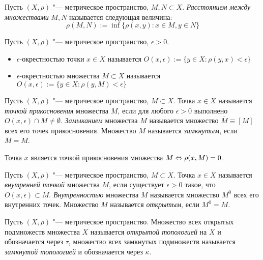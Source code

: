 \begin{definition}
	Пусть $(X, \rho)$ "--- метрическое пространство, $M, N \subset X$. \textit{Расстоянием между множествами} $M, N$ называется следующая величина:
	\[\rho(M, N) := \inf\{\rho(x, y): x \in M, y \in N\}\]
\end{definition}

\begin{definition}
	Пусть $(X, \rho)$ "--- метрическое пространство, $\epsilon > 0$.
	\begin{itemize}
		\item $\epsilon$-окрестностью точки $x \in X$ называется $O(x, \epsilon) := \{y \in X: \rho(y, x) < \epsilon\}$
		
		\item $\epsilon$-окрестностью множества $M \subset X$ называется $O(x, \epsilon) := \{y \in X: \rho(y, M) < \epsilon\}$
	\end{itemize}
\end{definition}

\begin{definition}
	Пусть $(X, \rho)$ "--- метрическое пространство, $M \subset X$. Точка $x \in X$ называется \textit{точкой прикосновения} множества $M$, если для любого $\epsilon > 0$ выполнено $O(x, \epsilon) \cap M \ne \emptyset$. \textit{Замыканием} множества $M$ называется множество $\overline M \equiv [M]$ всех его точек прикосновения. Множество $M$ называется \textit{замкнутым}, если $\overline M = M$.
\end{definition}

\begin{note}
	Точка $x$ является точкой прикосновения множества $M \Leftrightarrow \rho(x, M) = 0$.
\end{note}

\begin{definition}
	Пусть $(X, \rho)$ "--- метрическое пространство, $M \subset X$. Точка $x \in X$ называется \textit{внутренней точкой} множества $M$, если существует $\epsilon > 0$ такое, что $O(x, \epsilon) \subset M$. \textit{Внутренностью} множества $M$ называется множество $M^0$ всех его внутренних точек. Множество $M$ называется \textit{открытым}, если $M^0 = M$.
\end{definition}

\begin{definition}
	Пусть $(X, \rho)$ "--- метрическое пространство. Множество всех открытых подмножеств множества $X$ называется \textit{открытой топологией} на $X$ и обозначается через $\tau$, множество всех замкнутых подмножеств называется \textit{замкнутой топологией} и обозначается через $\kappa$.
\end{definition}

